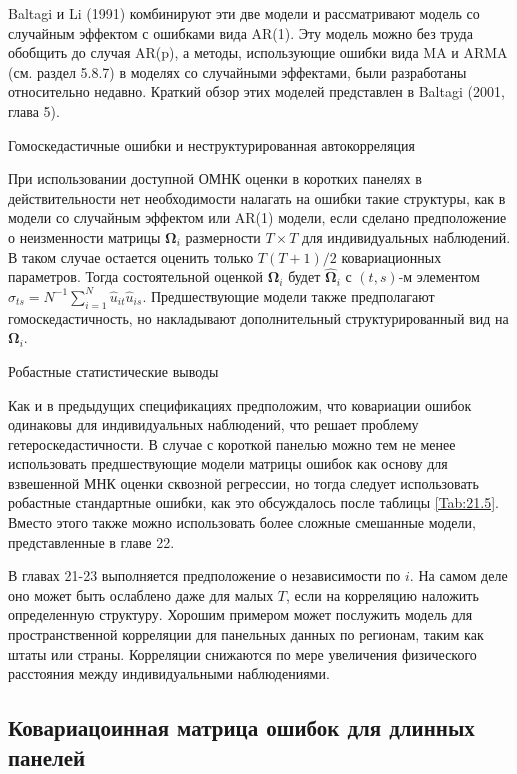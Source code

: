 Baltagi и Li (1991) комбинируют эти две модели и рассматривают модель со случайным эффектом с ошибками вида AR(1). Эту модель можно без труда обобщить до случая AR(p), а методы, использующие ошибки вида MA и ARMA (см. раздел 5.8.7) в моделях со случайными эффектами, были разработаны относительно недавно. Краткий обзор этих моделей представлен в Baltagi (2001, глава 5).  

{\centering
Гомоскедастичные ошибки и неструктурированная автокорреляция \\}

При использовании доступной ОМНК оценки в коротких панелях в действительности нет необходимости налагать на ошибки такие структуры, как в модели со случайным эффектом или AR(1) модели, если сделано предположение о неизменности матрицы $\bm\Omega_i$ размерности $T \times T$ для индивидуальных наблюдений. В таком случае остается оценить только $T(T+1)/2$ ковариационных параметров. Тогда состоятельной оценкой $\bm\Omega_i$ будет $\hat{\bm\Omega}_i$ с $(t,s)$-м элементом $\hat{\sigma}_{ts}=N^{-1} \sum^N_{i=1} \hat{u}_{it} \hat{u}_{is}$. Предшествующие модели также предполагают гомоскедастичность, но накладывают дополнительный структурированный вид на $\bm\Omega_i$.

{\centering
Робастные статистические выводы\\}

Как и в предыдущих спецификациях предположим, что ковариации ошибок одинаковы для индивидуальных наблюдений, что решает проблему гетероскедастичности. В случае с короткой панелью можно тем не менее использовать предшествующие модели матрицы ошибок как основу для взвешенной МНК оценки сквозной регрессии, но тогда следует использовать робастные стандартные ошибки, как это обсуждалось после таблицы \ref{Tab:21.5}. Вместо этого также можно использовать  более сложные  смешанные модели, представленные в главе 22.

В главах 21-23 выполняется предположение о независимости по $i$. На самом деле оно может быть ослаблено даже для малых $T$, если на корреляцию наложить определенную структуру. Хорошим примером может послужить модель для пространственной корреляции для панельных данных по регионам, таким как штаты или страны. Корреляции снижаются по мере увеличения физического расстояния между индивидуальными наблюдениями. 

\subsection{Ковариацоинная матрица ошибок для длинных панелей}

